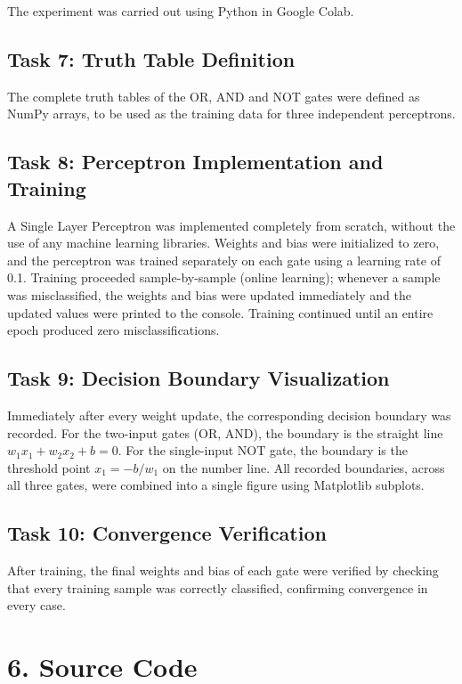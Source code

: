 \documentclass[11pt,a4paper]{article}
\begin{document}
The experiment was carried out using Python in Google Colab.


\subsection*{Task 7: Truth Table Definition}

The complete truth tables of the OR, AND and NOT gates were defined as NumPy arrays, to be used as the training data for three independent perceptrons.


\subsection*{Task 8: Perceptron Implementation and Training}

A Single Layer Perceptron was implemented completely from scratch, without the use of any machine learning libraries. Weights and bias were initialized to zero, and the perceptron was trained separately on each gate using a learning rate of 0.1. Training proceeded sample-by-sample (online learning); whenever a sample was misclassified, the weights and bias were updated immediately and the updated values were printed to the console. Training continued until an entire epoch produced zero misclassifications.


\subsection*{Task 9: Decision Boundary Visualization}

Immediately after every weight update, the corresponding decision boundary was recorded. For the two-input gates (OR, AND), the boundary is the straight line $w_1x_1+w_2x_2+b=0$. For the single-input NOT gate, the boundary is the threshold point $x_1=-b/w_1$ on the number line. All recorded boundaries, across all three gates, were combined into a single figure using Matplotlib subplots.


\subsection*{Task 10: Convergence Verification}

After training, the final weights and bias of each gate were verified by checking that every training sample was correctly classified, confirming convergence in every case.
\section*{6. Source Code}
\end{document}
